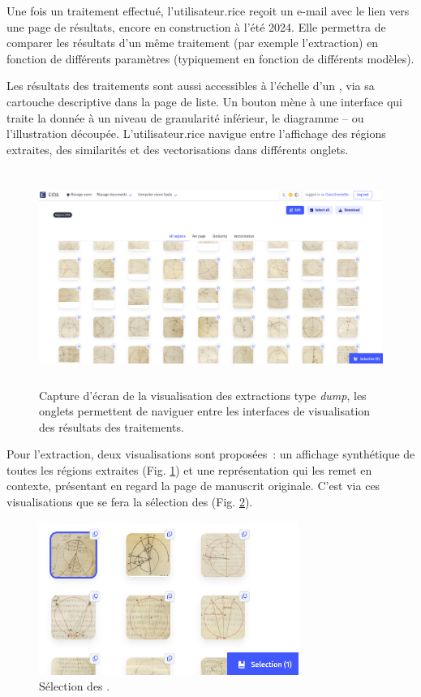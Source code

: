 Une fois un traitement effectué, l'utilisateur.rice reçoit un e-mail avec le
lien vers une page de résultats, encore en construction à l'été 2024.
Elle permettra de comparer les résultats d'un même traitement (par
exemple l'extraction) en fonction de différents paramètres (typiquement
en fonction de différents modèles).

Les résultats des traitements sont aussi accessibles à l'échelle d'un
\wit, via sa cartouche descriptive dans la page de liste. Un bouton
mène à une interface qui traite la donnée à un niveau de granularité
inférieur, le diagramme -- ou l'illustration découpée. L'utilisateur.rice
navigue entre l'affichage des régions extraites, des similarités et des
vectorisations dans différents onglets.

\begin{figure}[H]
          \begin{center}
          \includegraphics[height=7cm]{figues/dump_regions.png}
          \end{center}
          \caption{Capture d'écran de la visualisation des extractions type \textit{dump}, les onglets permettent de naviguer entre les interfaces de visualisation des résultats des traitements.}
          \label{fig:dump} \end{figure}

Pour l'extraction, deux visualisations sont proposées~: un affichage
synthétique de toutes les régions extraites (Fig. \ref{fig:dump}) et une représentation qui
les remet en contexte, présentant en regard la page de manuscrit
originale. C'est via ces visualisations que se fera la sélection des \rss (Fig. \ref{fig:selection}).

\begin{figure}[H]
	\begin{center}
		\includegraphics[height=5cm]{figues/selection.png}
	\end{center}
	\caption{Sélection des \rss.}
	\label{fig:selection} \end{figure}

